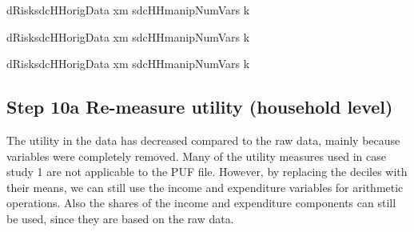 \documentclass[letterpaper,10pt,english]{sphinxmanual}
\begin{document}
\def\sphinxLiteralBlockLabel{\label{\detokenize{case_studies:code939}}}
%
\begin{sphinxVerbatim}[commandchars=\\\{\},numbers=left,firstnumber=1,stepnumber=1]
dRisksdcHHorigData\PYG{p}{[} \PYG{p}{]}
      xm  sdcHHmanipNumVars\PYG{p}{[} \PYG{p}{]} k  

dRisksdcHHorigData\PYG{p}{[} \PYG{p}{]}
      xm  sdcHHmanipNumVars\PYG{p}{[} \PYG{p}{]} k  

dRisksdcHHorigData\PYG{p}{[} \PYG{p}{]}
      xm  sdcHHmanipNumVars\PYG{p}{[} \PYG{p}{]} k  
\end{sphinxVerbatim}


\subsection{Step 10a Re-measure utility (household level)}
\label{\detokenize{case_studies:step-10a-re-measure-utility-household-level}}
The utility in the data has decreased compared to the raw data, mainly
because variables were completely removed. Many of the utility measures
used in case study 1 are not applicable to the PUF file. However, by
replacing the deciles with their means, we can still use the income and
expenditure variables for arithmetic operations. Also the shares of the
income and expenditure components can still be used, since they are
based on the raw data.
\end{document}
